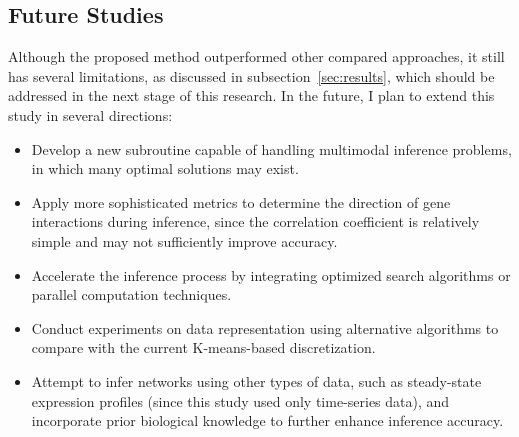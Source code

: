 \subsection{Future Studies}
Although the proposed method outperformed other compared approaches, it still has 
several limitations, as discussed in subsection~\ref{sec:results}, which should be 
addressed in the next stage of this research. In the future, I plan to extend this 
study in several directions:
\begin{itemize}
    \item Develop a new subroutine capable of handling multimodal inference problems, 
    in which many optimal solutions may exist.
    \item Apply more sophisticated metrics to determine the direction of gene 
    interactions during inference, since the correlation coefficient is relatively 
    simple and may not sufficiently improve accuracy.
    \item Accelerate the inference process by integrating optimized search algorithms 
    or parallel computation techniques.
    \item Conduct experiments on data representation using alternative algorithms to 
    compare with the current K-means-based discretization.
    \item Attempt to infer networks using other types of data, such as steady-state 
    expression profiles (since this study used only time-series data), and incorporate 
    prior biological knowledge to further enhance inference accuracy.
\end{itemize}
